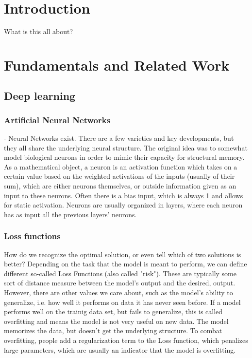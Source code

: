 \documentclass[twoside,12pt,a4paper]{report}
\begin{document}
\tableofcontents

\renewcommand{\baselinestretch}{1}
\small\normalsize

\cleardoublepage


\setcounter{page}{1}


\chapter{Introduction}
What is this all about?


\chapter{Fundamentals and Related Work}

\section{Deep learning}
\subsection{Artificial Neural Networks}
- Neural Networks exist. There are a few varieties and key developments, but they all share the underlying neural structure.
The original idea was to somewhat model biological neurons in order to mimic their capacity for structural memory.
As a mathematical object, a neuron is an activation function which takes on a certain value based on the weighted activations of the inputs (usually of their sum), which are either neurons themselves, or outside information given as an input to these neurons. Often there is a bias input, which is always 1 and allows for static activation.
Neurons are usually organized in layers, where each neuron has as input all the previous layers' neurons.

\subsection{Loss functions}
How do we recognize the optimal solution, or even tell which of two solutions is better?
Depending on the task that the model is meant to perform, we can define different so-called Loss Functions (also called "risk"). These are typically some sort of distance measure between the model's output and the desired, output.
However, there are other values we care about, such as the model's ability to generalize, i.e. how well it performs on data it has never seen before. If a model performs well on the trainig data set, but fails to generalize, this is called overfitting and means the model is not very useful on new data. The model memorizes the data, but doesn't get the underlying structure. To combat overfitting, people add a regularization term to the Loss function, which penalizes large parameters, which are usually an indicator that the model is overfitting.
\end{document}
